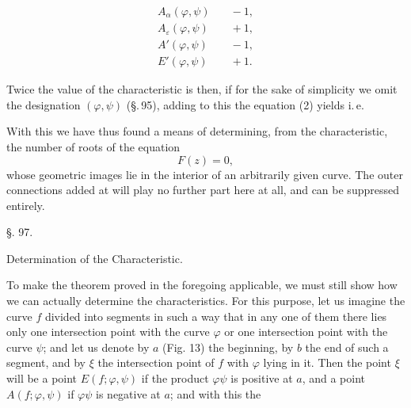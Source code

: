 \[
\begin{aligned}
A_\alpha(\varphi,\psi) &\quad -1,\\
A_\varepsilon(\varphi,\psi) &\quad +1,\\
A'(\varphi,\psi) &\quad -1,\\
E'(\varphi,\psi) &\quad +1.
\end{aligned}
\]

Twice the value of the characteristic is then, if for the sake of simplicity we omit the designation $(\varphi,\psi)$ (§.\,95),
adding to this the equation (2) yields
i.\,e.\ 

With this we have thus found a means of determining, from the characteristic, the number of roots of the equation
\[
F(z) = 0,
\]
whose geometric images lie in the interior of an arbitrarily given curve. The outer connections added at will play no further part here at all, and can be suppressed entirely.

\begin{center}
§. 97.

Determination of the Characteristic.
\end{center}

To make the theorem proved in the foregoing applicable, we must still show how we can actually determine the characteristics. For this purpose, let us imagine the curve $f$ divided into segments in such a way that in any one of them there lies only one intersection point with the curve $\varphi$ or one intersection point with the curve $\psi$; and let us denote by $a$ (Fig. 13) the beginning, by $b$ the end of such a segment, and by $\xi$ the intersection point of $f$ with $\varphi$ lying in it. Then the point $\xi$ will be a point $E(f;\varphi,\psi)$ if the product $\varphi\psi$ is positive at $a$, and a point $A(f;\varphi,\psi)$ if $\varphi\psi$ is negative at $a$; and with this the

